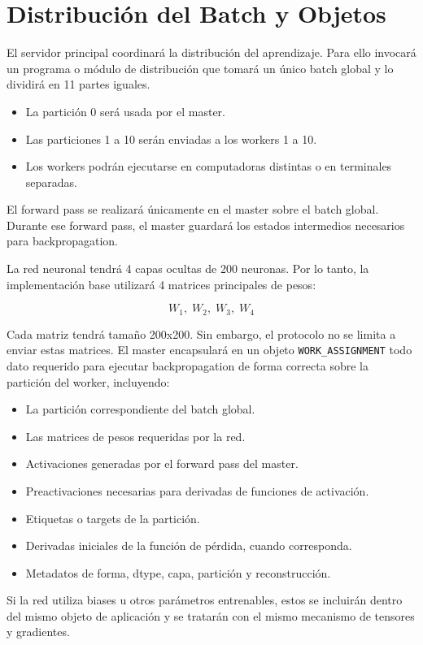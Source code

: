 \documentclass[12pt]{article}
\begin{document}
\section{Distribución del Batch y Objetos}

El servidor principal coordinará la distribución del aprendizaje. Para ello invocará un programa o módulo de distribución que tomará un único batch global y lo dividirá en 11 partes iguales.

\begin{itemize}
\item La partición 0 será usada por el master.
\item Las particiones 1 a 10 serán enviadas a los workers 1 a 10.
\item Los workers podrán ejecutarse en computadoras distintas o en terminales separadas.
\end{itemize}

El forward pass se realizará únicamente en el master sobre el batch global. Durante ese forward pass, el master guardará los estados intermedios necesarios para backpropagation.

La red neuronal tendrá 4 capas ocultas de 200 neuronas. Por lo tanto, la implementación base utilizará 4 matrices principales de pesos:

\[
W_1,\; W_2,\; W_3,\; W_4
\]

Cada matriz tendrá tamaño 200x200. Sin embargo, el protocolo no se limita a enviar estas matrices. El master encapsulará en un objeto \texttt{WORK\_ASSIGNMENT} todo dato requerido para ejecutar backpropagation de forma correcta sobre la partición del worker, incluyendo:

\begin{itemize}
\item La partición correspondiente del batch global.
\item Las matrices de pesos requeridas por la red.
\item Activaciones generadas por el forward pass del master.
\item Preactivaciones necesarias para derivadas de funciones de activación.
\item Etiquetas o targets de la partición.
\item Derivadas iniciales de la función de pérdida, cuando corresponda.
\item Metadatos de forma, dtype, capa, partición y reconstrucción.
\end{itemize}

Si la red utiliza biases u otros parámetros entrenables, estos se incluirán dentro del mismo objeto de aplicación y se tratarán con el mismo mecanismo de tensores y gradientes.
\end{document}
